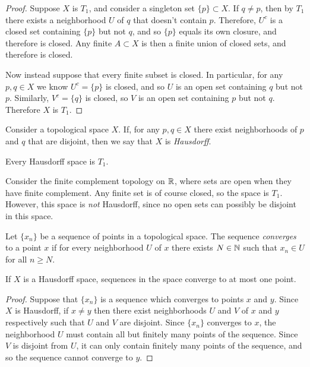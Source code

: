 \begin{proof}
    Suppose $X$ is $T_1$, and consider a singleton set $\{p\}\subset X$. If $q \neq p$, then by $T_1$ there exists a neighborhood $U$ of $q$ that doesn't contain $p$. Therefore, $U^c$ is a closed set containing $\{p\}$ but not $q$, and so $\{p\}$ equals its own closure, and therefore is closed. Any finite $A \subset X$ is then a finite union of closed sets, and therefore is closed.

    Now instead suppose that every finite subset is closed. In particular, for any $p, q \in X$ we know $U^c = \{p\}$ is closed, and so $U$ is an open set containing $q$ but not $p$. Similarly, $V^c = \{q\}$ is closed, so $V$ is an open set containing $p$ but not $q$. Therefore $X$ is $T_1$.
\end{proof}

\begin{defn}
    Consider a topological space $X$. If, for any $p, q \in X$ there exist neighborhoods of $p$ and $q$ that are disjoint, then we say that $X$ is \emph{Hausdorff}.
\end{defn}

\begin{lemma}
    Every Hausdorff space is $T_1$.
\end{lemma}

\begin{exmp}
    Consider the finite complement topology on $\mathbb{R}$, where sets are open when they have finite complement. Any finite set is of course closed, so the space is $T_1$. However, this space is \emph{not} Hausdorff, since no open sets can possibly be disjoint in this space.
\end{exmp}

\begin{defn}
    Let $\{x_n\}$ be a sequence of points in a topological space. The sequence \emph{converges} to a point $x$ if for every neighborhood $U$ of $x$ there exists $N \in \mathbb{N}$ such that $x_n \in U$ for all $n \geq N$.
\end{defn}

\begin{lemma}
    If $X$ is a Hausdorff space, sequences in the space converge to at most one point.
\end{lemma}

\begin{proof}
    Suppose that $\{x_n\}$ is a sequence which converges to points $x$ and $y$. Since $X$ is Hausdorff, if $x \neq y$ then there exist neighborhoods $U$ and $V$ of $x$ and $y$ respectively such that $U$ and $V$ are disjoint. Since $\{x_n\}$ converges to $x$, the neighborhood $U$ must contain all but finitely many points of the sequence. Since $V$ is disjoint from $U$, it can only contain finitely many points of the sequence, and so the sequence cannot converge to $y$.
\end{proof}

